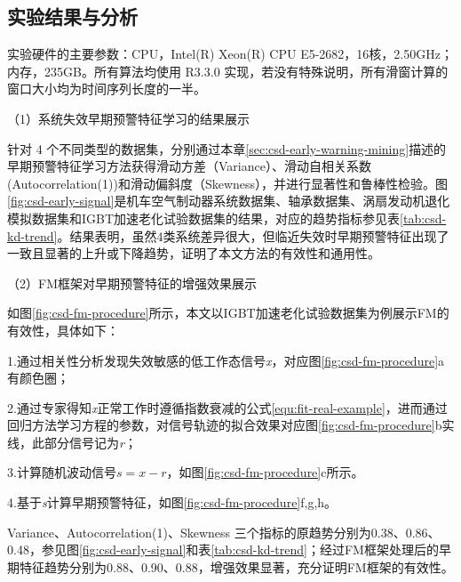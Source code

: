 \subsection{实验结果与分析}

实验硬件的主要参数：CPU，Intel(R) Xeon(R) CPU E5-2682，16核，2.50GHz；内存，235GB。所有算法均使用 R3.3.0 实现，若没有特殊说明，所有滑窗计算的窗口大小均为时间序列长度的一半。

（1）系统失效早期预警特征学习的结果展示

针对 4 个不同类型的数据集，分别通过本章\ref{sec:csd-early-warning-mining}描述的早期预警特征学习方法获得滑动方差（Variance）、滑动自相关系数(Autocorrelation(1))和滑动偏斜度（Skewness），并进行显著性和鲁棒性检验。图\ref{fig:csd-early-signal}是机车空气制动器系统数据集、轴承数据集、涡扇发动机退化模拟数据集和IGBT加速老化试验数据集的结果，对应的趋势指标参见表\ref{tab:csd-kd-trend}。结果表明，虽然4类系统差异很大，但临近失效时早期预警特征出现了一致且显著的上升或下降趋势，证明了本文方法的有效性和通用性。

（2）FM框架对早期预警特征的增强效果展示

如图\ref{fig:csd-fm-procedure}所示，本文以IGBT加速老化试验数据集为例展示FM的有效性，具体如下：

1.通过相关性分析发现失效敏感的低工作态信号\emph{x}，对应图\ref{fig:csd-fm-procedure}a有颜色圈；

2.通过专家得知\emph{x}正常工作时遵循指数衰减的公式\ref{equ:fit-real-example}，进而通过回归方法学习方程的参数，对信号轨迹的拟合效果对应图\ref{fig:csd-fm-procedure}b实线，此部分信号记为\emph{r}；

3.计算随机波动信号$s = x - r$，如图\ref{fig:csd-fm-procedure}c所示。

4.基于\emph{s}计算早期预警特征，如图\ref{fig:csd-fm-procedure}f,g,h。

Variance、Autocorrelation(1)、Skewness 三个指标的原趋势分别为0.38、0.86、0.48，参见图\ref{fig:csd-early-signal}和表\ref{tab:csd-kd-trend}；经过FM框架处理后的早期特征趋势分别为0.88、0.90、0.88，增强效果显著，充分证明FM框架的有效性。

